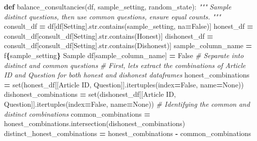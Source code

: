 \documentclass[
]{article}
\newenvironment{Shaded}{\begin{snugshade}}{\end{snugshade}}
\newcommand{\BuiltInTok}[1]{#1}
\newcommand{\CommentTok}[1]{\textcolor[rgb]{0.56,0.35,0.01}{\textit{#1}}}
\newcommand{\KeywordTok}[1]{\textcolor[rgb]{0.13,0.29,0.53}{\textbf{#1}}}
\newcommand{\NormalTok}[1]{#1}
\newcommand{\OperatorTok}[1]{\textcolor[rgb]{0.81,0.36,0.00}{\textbf{#1}}}
\newcommand{\SpecialCharTok}[1]{\textcolor[rgb]{0.81,0.36,0.00}{\textbf{#1}}}
\newcommand{\SpecialStringTok}[1]{\textcolor[rgb]{0.31,0.60,0.02}{#1}}
\newcommand{\StringTok}[1]{\textcolor[rgb]{0.31,0.60,0.02}{#1}}
\newcommand{\VariableTok}[1]{\textcolor[rgb]{0.00,0.00,0.00}{#1}}
\begin{document}
\begin{Shaded}
\begin{Highlighting}[]
\KeywordTok{def}\NormalTok{ balance\_consultancies(df, sample\_setting, random\_state):}
    \CommentTok{"""}
\CommentTok{    Sample distinct questions, then use common questions, ensure equal counts.}
\CommentTok{    """}
\NormalTok{    consult\_df }\OperatorTok{=}\NormalTok{ df[df[}\StringTok{\textquotesingle{}Setting\textquotesingle{}}\NormalTok{].}\BuiltInTok{str}\NormalTok{.contains(sample\_setting, na}\OperatorTok{=}\VariableTok{False}\NormalTok{)]}
\NormalTok{    honest\_df }\OperatorTok{=}\NormalTok{ consult\_df[consult\_df[}\StringTok{\textquotesingle{}Setting\textquotesingle{}}\NormalTok{].}\BuiltInTok{str}\NormalTok{.contains(}\StringTok{\textquotesingle{}Honest\textquotesingle{}}\NormalTok{)]}
\NormalTok{    dishonest\_df }\OperatorTok{=}\NormalTok{ consult\_df[consult\_df[}\StringTok{\textquotesingle{}Setting\textquotesingle{}}\NormalTok{].}\BuiltInTok{str}\NormalTok{.contains(}\StringTok{\textquotesingle{}Dishonest\textquotesingle{}}\NormalTok{)]}
\NormalTok{    sample\_column\_name }\OperatorTok{=} \SpecialStringTok{f\textquotesingle{}}\SpecialCharTok{\{}\NormalTok{sample\_setting}\SpecialCharTok{\}}\SpecialStringTok{ Sample\textquotesingle{}}
\NormalTok{    df[sample\_column\_name] }\OperatorTok{=} \VariableTok{False}
    \CommentTok{\# Separate into distinct and common questions}
    \CommentTok{\# First, let\textquotesingle{}s extract the combinations of \textquotesingle{}Article ID\textquotesingle{} and \textquotesingle{}Question\textquotesingle{} for both honest and dishonest dataframes}
\NormalTok{    honest\_combinations }\OperatorTok{=} \BuiltInTok{set}\NormalTok{(honest\_df[[}\StringTok{\textquotesingle{}Article ID\textquotesingle{}}\NormalTok{, }\StringTok{\textquotesingle{}Question\textquotesingle{}}\NormalTok{]].itertuples(index}\OperatorTok{=}\VariableTok{False}\NormalTok{, name}\OperatorTok{=}\VariableTok{None}\NormalTok{))}
\NormalTok{    dishonest\_combinations }\OperatorTok{=} \BuiltInTok{set}\NormalTok{(dishonest\_df[[}\StringTok{\textquotesingle{}Article ID\textquotesingle{}}\NormalTok{, }\StringTok{\textquotesingle{}Question\textquotesingle{}}\NormalTok{]].itertuples(index}\OperatorTok{=}\VariableTok{False}\NormalTok{, name}\OperatorTok{=}\VariableTok{None}\NormalTok{))}
    \CommentTok{\# Identifying the common and distinct combinations}
\NormalTok{    common\_combinations }\OperatorTok{=}\NormalTok{ honest\_combinations.intersection(dishonest\_combinations)}
\NormalTok{    distinct\_honest\_combinations }\OperatorTok{=}\NormalTok{ honest\_combinations }\OperatorTok{{-}}\NormalTok{ common\_combinations}

\end{Highlighting}
\end{Shaded}
\end{document}
